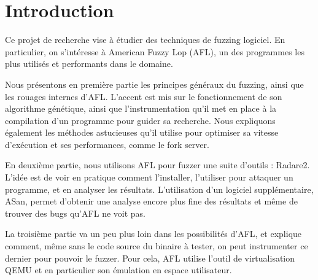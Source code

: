\chapter*{Introduction}

Ce projet de recherche vise à étudier des techniques de fuzzing logiciel. En
particulier, on s'intéresse à American Fuzzy Lop (AFL), un des programmes les
plus utilisés et performants dans le domaine.

Nous présentons en première partie les principes généraux du fuzzing, ainsi que
les rouages internes d'AFL. L'accent est mis sur le fonctionnement de son
algorithme génétique, ainsi que l'instrumentation qu'il met en place à la
compilation d'un programme pour guider sa recherche. Nous expliquons également
les méthodes astucieuses qu'il utilise pour optimiser sa vitesse d'exécution
et ses performances, comme le fork server.

En deuxième partie, nous utilisons AFL pour fuzzer une suite d'outils :
Radare2. L'idée est de voir en pratique comment l'installer, l'utiliser
pour attaquer un programme, et en analyser les résultats.
L'utilisation d'un logiciel supplémentaire, ASan, permet d'obtenir une
analyse encore plus fine des résultats et même de trouver des bugs qu'AFL ne
voit pas.

La troisième partie va un peu plus loin dans les possibilités d'AFL, et
explique comment, même sans le code source du binaire à tester, on peut
instrumenter ce dernier pour pouvoir le fuzzer. Pour cela, AFL utilise l'outil
de virtualisation QEMU et en particulier son émulation en espace utilisateur.
